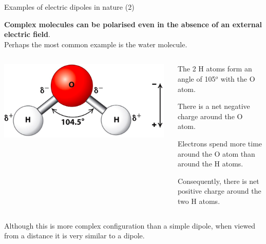 %
%
%

\begin{frame}{Examples of electric dipoles in nature (2)}

{\bf Complex molecules can be polarised even in the absence of an external electric field}.\\
\vspace{0.1cm}
Perhaps the most common example is the water molecule.\\
\vspace{0.2cm}

\begin{columns}
  \begin{column}{0.50\textwidth}
   \begin{center}
     \includegraphics[width=0.98\textwidth]{./images/schematics/dipole_H2O_1.png}\\
   \end{center}
  \end{column}
  \begin{column}{0.50\textwidth}
    \begin{itemize}
    {\small
      \item The 2 H atoms form an angle of 105$^o$ with the O atom.
      \item There is a net negative charge around the O atom.
        \begin{itemize}
        {\scriptsize
            \item Electrons spend more time around the O atom than around the H atoms.
        }
        \end{itemize}
      \item Consequently, there is net positive charge around the two H atoms.\\
    }
    \end{itemize}
  \end{column}
\end{columns}

\vspace{0.4cm}

Although this is more complex configuration than a simple dipole,
when viewed from a distance it is very similar to a dipole.\\

\end{frame}

